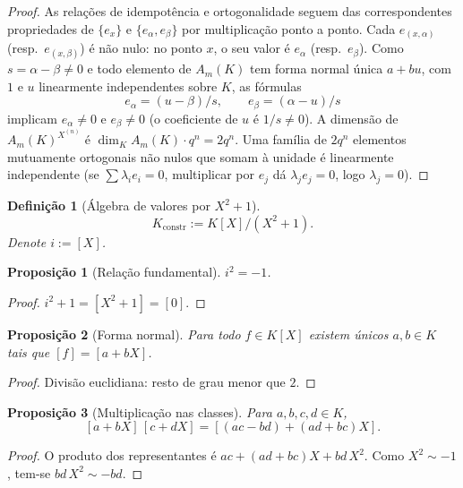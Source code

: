 \documentclass[11pt,a4paper]{article}
\newtheorem{definicao}{Definição}
\newtheorem{proposicao}{Proposição}
\begin{document}
\begin{proof}
As relações de idempotência e ortogonalidade seguem das correspondentes
propriedades de \(\{e_x\}\) e \(\{e_\alpha,e_\beta\}\) por multiplicação
ponto a ponto.
Cada \(e_{(x,\alpha)}\) (resp.\ \(e_{(x,\beta)}\)) é não nulo:
no ponto \(x\), o seu valor é \(e_\alpha\) (resp.\ \(e_\beta\)).
Como \(s=\alpha-\beta\neq 0\) e todo elemento de \(A_m(K)\) tem forma
normal única \(a+bu\), com \(1\) e \(u\) linearmente independentes sobre
\(K\), as fórmulas
\[
e_\alpha=(u-\beta)/s,\qquad e_\beta=(\alpha-u)/s
\]
implicam \(e_\alpha\neq 0\) e \(e_\beta\neq 0\)
(o coeficiente de \(u\) é \(1/s\neq 0\)).
A dimensão de \(A_m(K)^{X^{(n)}}\) é \(\dim_K A_m(K)\cdot q^n=2q^n\).
Uma família de \(2q^n\) elementos mutuamente ortogonais não nulos que somam
à unidade é linearmente independente (se \(\sum\lambda_i e_i=0\), multiplicar
por \(e_j\) dá \(\lambda_j e_j=0\), logo \(\lambda_j=0\)).
\end{proof}


\begin{definicao}[Álgebra de valores por \(X^2+1\)]
\label{def:Kconstr}
\[
K_{\mathrm{constr}} := K[X]/(X^2+1).
\]
Denote \(i:=[X]\).
\end{definicao}

\begin{proposicao}[Relação fundamental]
\label{prop:i}
\(i^2=-1\).
\end{proposicao}

\begin{proof}
\(i^2+1=[X^2+1]=[0]\).
\end{proof}

\begin{proposicao}[Forma normal]
\label{prop:forma-normal}
Para todo \(f\in K[X]\) existem únicos \(a,b\in K\) tais que
\([f]=[a+bX]\).
\end{proposicao}

\begin{proof}
Divisão euclidiana: resto de grau menor que \(2\).
\end{proof}

\begin{proposicao}[Multiplicação nas classes]
\label{prop:mult-classes}
Para \(a,b,c,d\in K\),
\[
[a+bX]\,[c+dX] = [(ac-bd)+(ad+bc)X].
\]
\end{proposicao}

\begin{proof}
O produto dos representantes é \(ac+(ad+bc)X+bd\,X^2\).
Como \(X^2\sim -1\), tem-se \(bd\,X^2\sim -bd\).
\end{proof}
\end{document}
